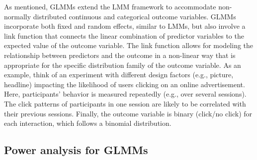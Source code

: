 \documentclass[
  man,floatsintext]{apa6}
\begin{document}
As mentioned, GLMMs extend the LMM framework to accommodate non-normally distributed continuous and categorical outcome variables.
GLMMs incorporate both fixed and random effects, similar to LMMs, but also involve a link function that connects the linear combination of predictor variables to the expected value of the outcome variable. The link function allows for modeling the relationship between predictors and the outcome in a non-linear way that is appropriate for the specific distribution family of the outcome variable.
As an example, think of an experiment with different design factors (e.g., picture, headline) impacting the likelihood of users clicking on an online advertisement. Here, participants' behavior is measured repeatedly (e.g., over several sessions). The click patterns of participants in one session are likely to be correlated with their previous sessions. Finally, the outcome variable is binary (click/no click) for each interaction, which follows a binomial distribution.

\hypertarget{power-analysis-for-glmms}{%
\subsection{Power analysis for GLMMs}\label{power-analysis-for-glmms}}
\end{document}
